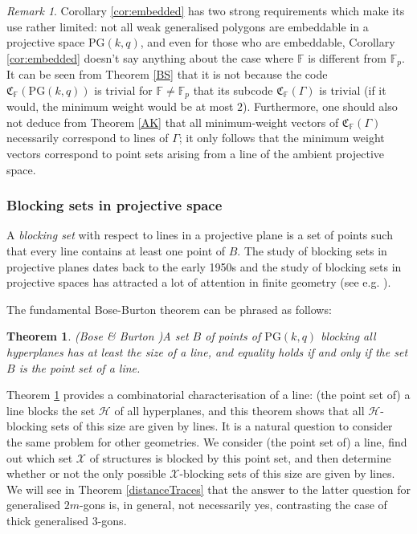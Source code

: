 \documentclass[12pt]{article}
\newcommand{\F}{\mathbb{F}}
\newcommand{\PG}{\mathrm{PG}}
\newcommand{\Code}{\mathfrak{C}_\F}
\newtheorem{theorem}{Theorem}
\theoremstyle{remark}
\newtheorem{remark}{Remark}
\begin{document}
\begin{remark} Corollary \ref{cor:embedded} has two strong requirements which make its use rather limited: not all weak generalised polygons are embeddable in a projective space $\PG(k,q)$, and even for those who are embeddable, Corollary \ref{cor:embedded} doesn't say anything about the case where $\mathbb{F}$ is different from $\mathbb{F}_p$. It can be seen from Theorem \ref{BS} that it is not because the code \(\Code(\PG(k,q))\) is trivial for $\mathbb{F}\neq \mathbb{F}_p$ that its subcode \(\Code(\Gamma)\) is trivial (if it would, the minimum weight would be at most $2$). Furthermore, one should also not deduce from Theorem \ref{AK} that all minimum-weight vectors of \(\Code(\Gamma)\)  necessarily correspond to lines of $\Gamma$; it only follows that the minimum weight vectors correspond to point sets arising from a line of the ambient projective space.
\end{remark}

\subsubsection{Blocking sets in projective space}
A {\em blocking set} with respect to lines in a projective plane is a set of points such that every line contains at least one point of $B$. The study of blocking sets in projective planes dates back to the early 1950s \cite{Richardson} and the study of blocking sets in projective spaces has attracted a lot of attention in finite geometry (see e.g. \cite{blokhuis2011blocking}). 

The fundamental Bose-Burton theorem can be phrased as follows:

\begin{theorem}(Bose \& Burton \cite{BoseBurton})\label{BoseBurton}
A set $B$ of points of $\PG(k,q)$ blocking all hyperplanes has at least the size of a line, and equality holds if and only if the set $B$ is the point set of a line.
\end{theorem}

Theorem \ref{BoseBurton} provides a combinatorial characterisation of a line: (the point set of) a line blocks the set $\mathcal{H}$ of all hyperplanes, and this theorem shows that all $\mathcal{H}$-blocking sets of this size are given by lines.
It is a natural question to consider the same problem for other geometries. We consider (the point set of) a line, find out which set $\mathcal{X}$ of structures is blocked by this point set, and then determine whether or not the only possible $\mathcal{X}$-blocking sets of this size are given by lines.
We will see in Theorem \ref{distanceTraces} that the answer to the latter question for generalised $2m$-gons is, in general, not necessarily yes, contrasting the case of thick generalised $3$-gons.
\end{document}

